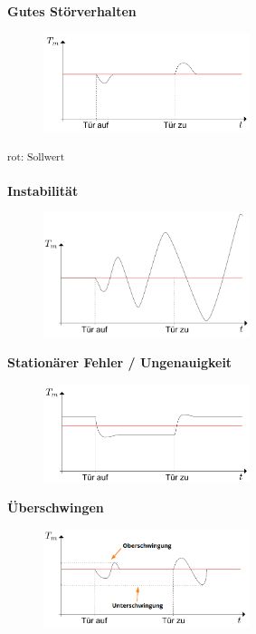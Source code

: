 \documentclass[
  10pt,
  a4paper,
  twocolumn]{article}
\numberwithin{equation}{section}
\begin{document}
\textbf{Gutes Störverhalten}

\begin{figure}[H]

{\centering \includegraphics[width=6cm,height=\textheight]{images/storverhalten/gutes_verhalten.png}

}

\end{figure}

\textsuperscript{rot: Sollwert}

\textbf{Instabilität}

\begin{figure}[H]

{\centering \includegraphics[width=6cm,height=\textheight]{images/storverhalten/storverhalten_stability.png}

}

\end{figure}

\textbf{Stationärer Fehler / Ungenauigkeit}

\begin{figure}[H]

{\centering \includegraphics[width=6cm,height=\textheight]{images/storverhalten/storverhalten_stationary.png}

}

\end{figure}

\textbf{Überschwingen}

\begin{figure}[H]

{\centering \includegraphics[width=6cm,height=\textheight]{images/storverhalten/uber_unterschwingung.png}

}

\end{figure}
\end{document}
